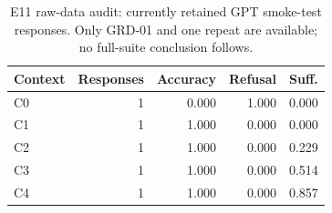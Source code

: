 \begin{table}[t]
\centering\footnotesize
\caption{E11 raw-data audit: currently retained GPT smoke-test responses. Only GRD-01 and one repeat are available; no full-suite conclusion follows.}
\label{tab:e11-verified}
\setlength{\tabcolsep}{3.5pt}
\begin{tabular}{@{}lrrrr@{}}
\toprule
Context & Responses & Accuracy & Refusal & Suff. \\
\midrule
C0 & 1 & 0.000 & 1.000 & 0.000 \\
C1 & 1 & 1.000 & 0.000 & 0.000 \\
C2 & 1 & 1.000 & 0.000 & 0.229 \\
C3 & 1 & 1.000 & 0.000 & 0.514 \\
C4 & 1 & 1.000 & 0.000 & 0.857 \\
\bottomrule
\end{tabular}
\end{table}
